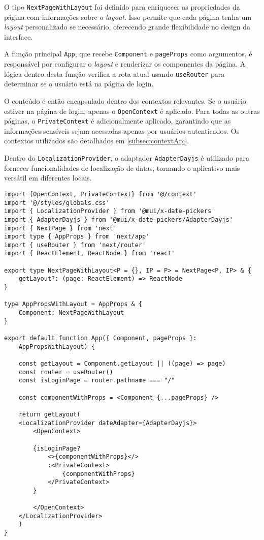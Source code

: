 O tipo \texttt{NextPageWithLayout} foi definido para enriquecer as propriedades da página com informações sobre o \textit{layout}. Isso permite que cada página tenha um \textit{layout} personalizado se necessário, oferecendo grande flexibilidade no design da interface.

A função principal \texttt{App}, que recebe \texttt{Component} e \texttt{pageProps} como argumentos, é responsável por configurar o \textit{layout} e renderizar os componentes da página. A lógica dentro desta função verifica a rota atual usando \texttt{useRouter} \cite{nextjsUseRouter} para determinar se o usuário está na página de login.

O conteúdo é então encapsulado dentro dos contextos relevantes. Se o usuário estiver na página de login, apenas o \texttt{OpenContext} é aplicado. Para todas as outras páginas, o \texttt{PrivateContext} é adicionalmente aplicado, garantindo que as informações sensíveis sejam acessadas apenas por usuários autenticados. Os contextos utilizados são detalhados em \ref{subsec:contextApi}.

Dentro do \texttt{LocalizationProvider}, o adaptador \texttt{AdapterDayjs} é utilizado para fornecer funcionalidades de localização de datas, tornando o aplicativo mais versátil em diferentes locais.


\begin{verbatim}
import {OpenContext, PrivateContext} from '@/context'
import '@/styles/globals.css'
import { LocalizationProvider } from '@mui/x-date-pickers'
import { AdapterDayjs } from '@mui/x-date-pickers/AdapterDayjs'
import { NextPage } from 'next'
import type { AppProps } from 'next/app'
import { useRouter } from 'next/router'
import { ReactElement, ReactNode } from 'react'

export type NextPageWithLayout<P = {}, IP = P> = NextPage<P, IP> & {
    getLayout?: (page: ReactElement) => ReactNode
}

type AppPropsWithLayout = AppProps & {
    Component: NextPageWithLayout
}

export default function App({ Component, pageProps }: 
    AppPropsWithLayout) {

    const getLayout = Component.getLayout || ((page) => page)
    const router = useRouter()
    const isLoginPage = router.pathname === "/"

    const componentWithProps = <Component {...pageProps} /> 

    return getLayout(
    <LocalizationProvider dateAdapter={AdapterDayjs}>
        <OpenContext>

        {isLoginPage?
            <>{componentWithProps}</>
            :<PrivateContext>
                {componentWithProps}
            </PrivateContext>
        }

        </OpenContext>  
    </LocalizationProvider>
    )
}
\end{verbatim}


